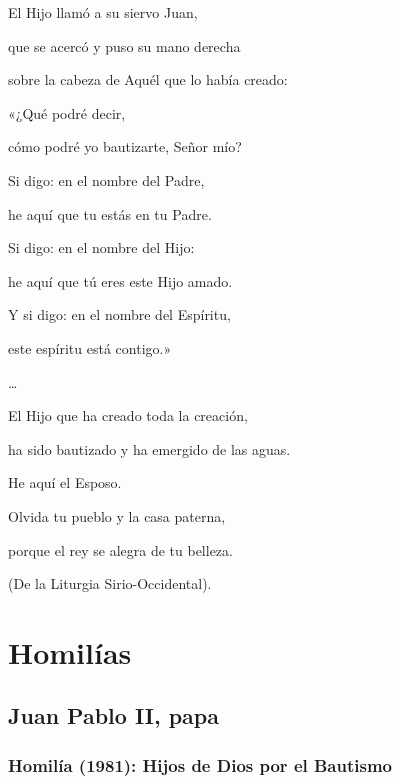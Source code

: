 			\begin{patercite}
				El Hijo llamó a su siervo Juan,
				
				que se acercó y puso su mano derecha
				
				sobre la cabeza de Aquél que lo había creado:
				
				«¿Qué podré decir,
				
				cómo podré yo bautizarte, Señor mío?
				
				Si digo: en el nombre del Padre,
				
				he aquí que tu estás en tu Padre.
				
				Si digo: en el nombre del Hijo:
				
				he aquí que tú eres este Hijo amado.
				
				Y si digo: en el nombre del Espíritu,
				
				este espíritu está contigo.»
				
				\ldots{}
				
				El Hijo que ha creado toda la creación,
				
				ha sido bautizado y ha emergido de las aguas.
				
				He aquí el Esposo.
				
				Olvida tu pueblo y la casa paterna,
				
				porque el rey se alegra de tu belleza.
				
				(De la Liturgia Sirio-Occidental).
			\end{patercite}

\newsection

	\section{Homilías}
	
		\subsection{Juan Pablo II, papa}
		
			\subsubsection{Homilía (1981): Hijos de Dios por el Bautismo}
			
				
